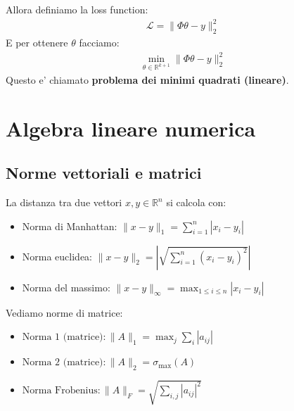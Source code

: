 \documentclass[a4paper,12pt]{article}
\begin{document}
Allora definiamo la loss function:
\begin{align*}
    \mathcal{L} = \| \Phi \theta - y \|_2^2
\end{align*}
E per ottenere $\theta$ facciamo:
\begin{align*}
    \min_{\theta \in \mathbb{R}^{k+1}} \| \Phi \theta - y \|_2^2
\end{align*}
Questo e' chiamato \textbf{problema dei minimi quadrati (lineare)}.
\pagebreak
\section{Algebra lineare numerica}
\subsection{Norme vettoriali e matrici}
La distanza tra due vettori $x, y \in \mathbb{R}^n$ si calcola con:
\begin{itemize}
    \item Norma di Manhattan: $\| x-y \|_1 = \sum_{i=1}^n | x_i-y_i |$
    \item Norma euclidea: $\| x-y \|_2 = | \sqrt{\sum_{i=1}^n(x_i - y_i)^2} |$
    \item Norma del massimo: $\|x - y\|_\infty = \max_{1 \le i \le n} |x_i - y_i|$
\end{itemize}
Vediamo norme di matrice:
\begin{itemize}
    \item $\text{Norma 1 (matrice)}: \|A\|_1 = \max_j \sum_i |a_{ij}|$ 
    \item $\text{Norma 2 (matrice)}: \|A\|_2 = \sigma_{\max}(A)$
    \item $\text{Norma Frobenius}: \|A\|_F = \sqrt{\sum_{i,j} |a_{ij}|^2}$
\end{itemize}
\end{document}
